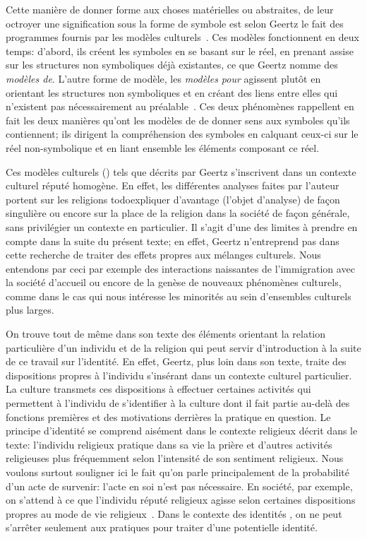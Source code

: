 Cette manière de donner forme aux choses matérielles ou abstraites, de leur octroyer une signification sous la forme de symbole est selon Geertz le fait des programmes fournis par les modèles culturels~\citep[25]{Geertz1972}. 
Ces modèles fonctionnent en deux temps: d'abord, ils créent les symboles en se basant sur le réel, en prenant assise sur les structures non symboliques déjà existantes, ce que Geertz nomme des \emph{modèles de}. 
L'autre forme de modèle, les \emph{modèles pour} agissent plutôt en orientant les structures non symboliques et en créant des liens entre elles qui n'existent pas nécessairement au préalable~\citep[26--27]{Geertz1972}. 
Ces deux phénomènes rappellent en fait les deux manières qu'ont les modèles de de donner sens aux symboles qu'ils contiennent; ils dirigent la compréhension des symboles en calquant ceux-ci sur le réel non-symbolique et en liant ensemble les éléments composant ce réel.

Ces modèles culturels () tels que décrits par Geertz s'inscrivent dans un contexte culturel réputé homogène. 
En effet, les différentes analyses faites par l'auteur portent sur les religions todo{expliquer d'avantage} (l'objet d'analyse) de façon singulière ou encore sur la place de la religion dans la société de façon générale, sans privilégier un contexte en particulier. 
Il s'agit d'une des limites à prendre en compte dans la suite du présent texte; en effet, Geertz n'entreprend pas dans cette recherche de traiter des effets propres aux mélanges culturels.
Nous entendons par ceci par exemple des interactions naissantes de l'immigration avec la société d'accueil ou encore de la genèse de nouveaux phénomènes culturels, comme dans le cas qui nous intéresse les minorités \lgbt{} au sein d'ensembles culturels plus larges.

On trouve tout de même dans son texte des éléments orientant la relation particulière d'un individu et de la religion qui peut servir d'introduction à la suite de ce travail sur l'identité. 
En effet, Geertz, plus loin dans son texte, traite des dispositions propres à l'individu s'insérant dans un contexte culturel particulier. 
La culture transmets ces dispositions à effectuer certaines activités qui permettent à l'individu de s'identifier à la culture dont il fait partie au-delà des fonctions premières et des motivations derrières la pratique en question. 
Le principe d'identité se comprend aisément dans le contexte religieux décrit dans le texte: l'individu religieux pratique dans sa vie la prière et d'autres activités religieuses plus fréquemment selon l'intensité de son sentiment religieux. 
Nous voulons surtout souligner ici le fait qu'on parle principalement de la probabilité d'un acte de survenir: l'acte en soi n'est pas nécessaire. 
En société, par exemple, on s'attend à ce que l'individu réputé religieux agisse selon certaines dispositions propres au mode de vie religieux~\citep[28--30]{Geertz1972}. 
Dans le contexte des identités \lgbt{}, on ne peut s'arrêter seulement aux pratiques pour traiter d'une potentielle identité.

